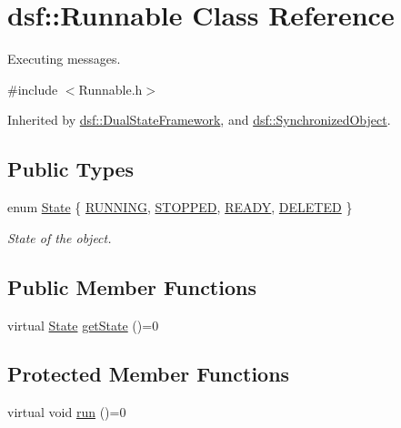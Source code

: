 \hypertarget{classdsf_1_1_runnable}{}\section{dsf\+:\+:Runnable Class Reference}
\label{classdsf_1_1_runnable}


Executing messages.  




{\ttfamily \#include $<$Runnable.\+h$>$}



Inherited by \hyperlink{classdsf_1_1_dual_state_framework}{dsf\+::\+Dual\+State\+Framework}, and \hyperlink{classdsf_1_1_synchronized_object}{dsf\+::\+Synchronized\+Object}.

\subsection*{Public Types}
\begin{DoxyCompactItemize}
\item 
enum \hyperlink{classdsf_1_1_runnable_a8eb63b21a0accc7a6a2a05f18e257991}{State} \{ \hyperlink{classdsf_1_1_runnable_a8eb63b21a0accc7a6a2a05f18e257991ad7167727fe5c31678c166aee6801ba0a}{R\+U\+N\+N\+I\+N\+G}, 
\hyperlink{classdsf_1_1_runnable_a8eb63b21a0accc7a6a2a05f18e257991a0897925165e6577c4d3ebb185178c9c5}{S\+T\+O\+P\+P\+E\+D}, 
\hyperlink{classdsf_1_1_runnable_a8eb63b21a0accc7a6a2a05f18e257991a60038f4f186bbe0d05fdbbe9da0f85de}{R\+E\+A\+D\+Y}, 
\hyperlink{classdsf_1_1_runnable_a8eb63b21a0accc7a6a2a05f18e257991aea5cfe327f95ca42d589e660b7cffe28}{D\+E\+L\+E\+T\+E\+D}
 \}
\begin{DoxyCompactList}\small\item\em State of the object. \end{DoxyCompactList}\end{DoxyCompactItemize}
\subsection*{Public Member Functions}
\begin{DoxyCompactItemize}
\item 
virtual \hyperlink{classdsf_1_1_runnable_a8eb63b21a0accc7a6a2a05f18e257991}{State} \hyperlink{classdsf_1_1_runnable_a139342b0d6d53fc7f1bbd97d99d3724a}{get\+State} ()=0
\end{DoxyCompactItemize}
\subsection*{Protected Member Functions}
\begin{DoxyCompactItemize}
\item 
virtual void \hyperlink{classdsf_1_1_runnable_a6e23b3b551a7cfdbff0e9ba2265d4378}{run} ()=0
\end{DoxyCompactItemize}


